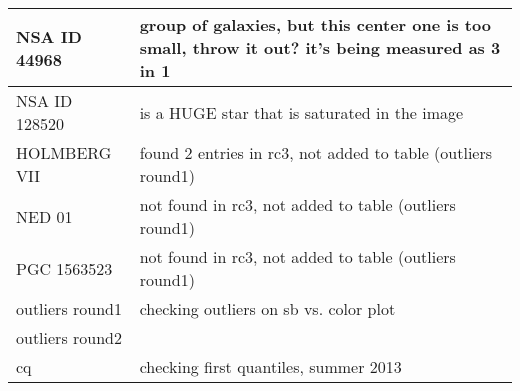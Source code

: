 \documentclass[10pt]{article}
\begin{document}
\begin{landscape}
\begin{longtable}{|l|l|}
NSA ID 44968 & group of galaxies, but this center one is too small, throw it out? it's being measured as 3 in 1\\ \hline
NSA ID 128520 & is a HUGE star that is saturated in the image\\ \hline
HOLMBERG VII & found 2 entries in rc3, not added to table (outliers round1)\\ \hline
NED 01 & not found in rc3, not added to table (outliers round1)\\ \hline
PGC 1563523 & not found in rc3, not added to table (outliers round1)\\ \hline
outliers round1 & checking outliers on sb vs. color plot\\ \hline
outliers round2 &\\ \hline
cq & checking first quantiles, summer 2013 \\ \hline
\end{longtable}
\end{landscape}
\end{document}
